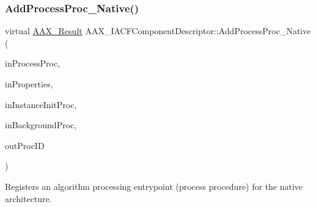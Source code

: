 \subsubsection{\texorpdfstring{AddProcessProc\_Native()}{AddProcessProc\_Native()}}
{\footnotesize\ttfamily virtual \mbox{\hyperlink{a00392_a4d8f69a697df7f70c3a8e9b8ee130d2f}{A\+A\+X\+\_\+\+Result}} A\+A\+X\+\_\+\+I\+A\+C\+F\+Component\+Descriptor\+::\+Add\+Process\+Proc\+\_\+\+Native (\begin{DoxyParamCaption}\item[{\mbox{\hyperlink{a00401_ad6dd5e1aa5bd2f8462966685e3b26a6e}{A\+A\+X\+\_\+\+C\+Process\+Proc}}}]{in\+Process\+Proc,  }\item[{\mbox{\hyperlink{a01409}{I\+A\+C\+F\+Unknown}} $\ast$}]{in\+Properties,  }\item[{\mbox{\hyperlink{a00401_a3963a850079d3186e08c97a1a4d0ef1c}{A\+A\+X\+\_\+\+C\+Instance\+Init\+Proc}}}]{in\+Instance\+Init\+Proc,  }\item[{\mbox{\hyperlink{a00401_aa64561d963284a3124a0821e7dc79c9a}{A\+A\+X\+\_\+\+C\+Background\+Proc}}}]{in\+Background\+Proc,  }\item[{\mbox{\hyperlink{a00392_aeaf9b387f902c50a8360ff423f4a1f23}{A\+A\+X\+\_\+\+C\+Selector}} $\ast$}]{out\+Proc\+ID }\end{DoxyParamCaption})\hspace{0.3cm}{\ttfamily [pure virtual]}}



Registers an algorithm processing entrypoint (process procedure) for the native architecture. 


